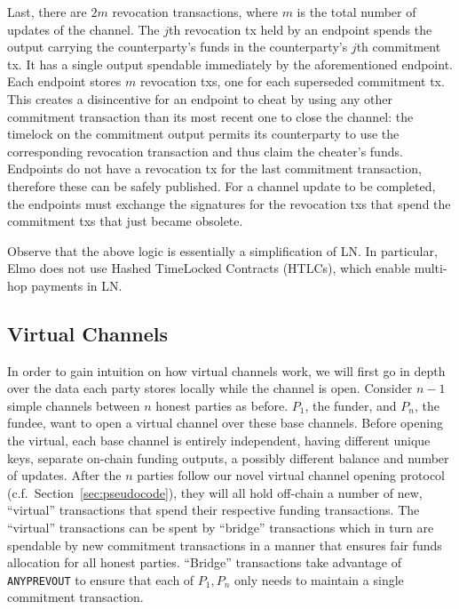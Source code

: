   Last, there are $2m$ revocation transactions, where $m$ is the total number of
  updates of the channel. The $j$th revocation tx held by an endpoint spends the
  output carrying the counterparty's funds in the counterparty's $j$th
  commitment tx. It has a single output spendable immediately by the
  aforementioned endpoint. Each endpoint stores $m$ revocation txs, one for each
  superseded commitment tx. This creates a disincentive for an endpoint to cheat
  by using any other commitment transaction than its most recent one to close
  the channel: the timelock on the commitment output permits its counterparty to
  use the corresponding revocation transaction and thus claim the cheater's
  funds.  Endpoints do not have a revocation tx for the last commitment
  transaction, therefore these can be safely published. For a channel update to
  be completed, the endpoints must exchange the signatures for the revocation
  txs that spend the commitment txs that just became obsolete.

  Observe that the above logic is essentially a simplification of LN. In
  particular, Elmo does not use Hashed TimeLocked Contracts (HTLCs), which
  enable multi-hop payments in LN.

\subsection{Virtual Channels}
  In order to gain intuition on how virtual channels work, we will first
  go in depth over the data each party stores locally while the channel is open.
  Consider $n-1$
  simple channels between $n$ honest parties as before. $P_1$, the
  funder, and $P_n$, the fundee, want to open a virtual channel over these base
  channels.
  Before opening the virtual, each base channel is entirely independent, having
  different unique keys, separate on-chain funding outputs, a possibly different
  balance and number of updates. After the $n$ parties follow our novel virtual
  channel opening protocol (c.f.\ Section~\ref{sec:pseudocode}), they will all
  hold off-chain a number of new,
  ``virtual'' transactions that spend their respective funding transactions. The
  ``virtual'' transactions can be spent by ``bridge'' transactions which in turn
  are spendable by new commitment transactions in a manner that ensures fair
  funds allocation for all honest parties. ``Bridge'' transactions take
  advantage of \texttt{ANYPREVOUT} to ensure that each of $P_1, P_n$ only needs
  to maintain a single commitment transaction.

